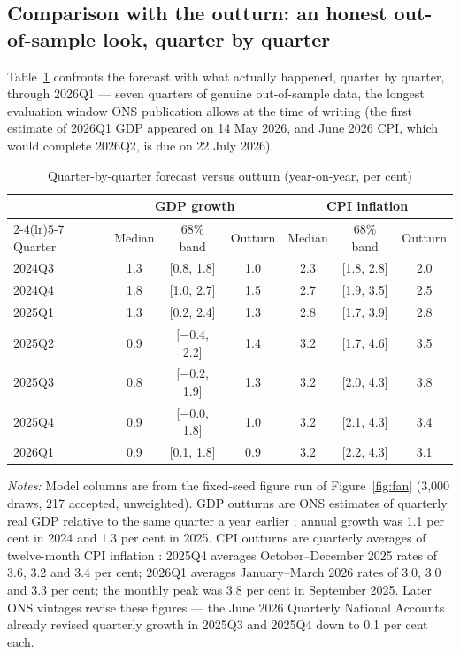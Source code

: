 \subsection{Comparison with the outturn: an honest out-of-sample look, quarter by quarter}

Table~\ref{tab:quarterly} confronts the forecast with what actually happened, quarter by quarter, through 2026Q1 --- seven quarters of genuine out-of-sample data, the longest evaluation window ONS publication allows at the time of writing (the first estimate of 2026Q1 GDP appeared on 14 May 2026, and June 2026 CPI, which would complete 2026Q2, is due on 22 July 2026).

\begin{table}[t]
\centering
\caption{Quarter-by-quarter forecast versus outturn (year-on-year, per cent)}
\label{tab:quarterly}
\small
\begin{tabular}{lcccccc}
\toprule
 & \multicolumn{3}{c}{GDP growth} & \multicolumn{3}{c}{CPI inflation} \\
\cmidrule(lr){2-4}\cmidrule(lr){5-7}
Quarter & Median & 68\% band & Outturn & Median & 68\% band & Outturn \\
\midrule
2024Q3 & 1.3 & [0.8, 1.8] & 1.0 & 2.3 & [1.8, 2.8] & 2.0 \\
2024Q4 & 1.8 & [1.0, 2.7] & 1.5 & 2.7 & [1.9, 3.5] & 2.5 \\
2025Q1 & 1.3 & [0.2, 2.4] & 1.3 & 2.8 & [1.7, 3.9] & 2.8 \\
2025Q2 & 0.9 & [$-0.4$, 2.2] & 1.4 & 3.2 & [1.7, 4.6] & 3.5 \\
2025Q3 & 0.8 & [$-0.2$, 1.9] & 1.3 & 3.2 & [2.0, 4.3] & 3.8 \\
2025Q4 & 0.9 & [$-0.0$, 1.8] & 1.0 & 3.2 & [2.1, 4.3] & 3.4 \\
2026Q1 & 0.9 & [0.1, 1.8] & 0.9 & 3.2 & [2.2, 4.3] & 3.1 \\
\bottomrule
\end{tabular}
\par\smallskip
\parbox{0.95\textwidth}{\footnotesize \emph{Notes:} Model columns are from the fixed-seed figure run of Figure~\ref{fig:fan} (3{,}000 draws, 217 accepted, unweighted). GDP outturns are ONS estimates of quarterly real GDP relative to the same quarter a year earlier \citep{ons2025gdp, ons2026gdp}; annual growth was 1.1 per cent in 2024 and 1.3 per cent in 2025. CPI outturns are quarterly averages of twelve-month CPI inflation \citep{ons2025cpi, ons2026cpi}: 2025Q4 averages October--December 2025 rates of 3.6, 3.2 and 3.4 per cent; 2026Q1 averages January--March 2026 rates of 3.0, 3.0 and 3.3 per cent; the monthly peak was 3.8 per cent in September 2025. Later ONS vintages revise these figures --- the June 2026 Quarterly National Accounts already revised quarterly growth in 2025Q3 and 2025Q4 down to 0.1 per cent each.}
\end{table}


